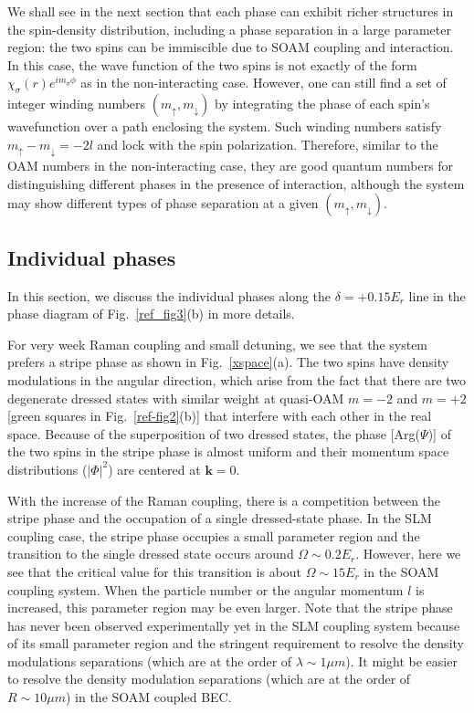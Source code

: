 \documentclass[twocolumn,pra,unsortedaddress,showpacs,floatfix,citeautoscript,nofootinbib]{revtex4-1}
\begin{document}
We shall see in the next section that each phase can exhibit
richer structures in the spin-density distribution, including a
phase separation in a large parameter region: the two spins can be
immiscible due to SOAM coupling and interaction. In this case, the
wave function of the two spins is not exactly of the form $\chi
_{\sigma }(r)e^{im_{\sigma }\phi }$ as in the non-interacting
case. However, one can still find a set of integer winding numbers
$(m_{\uparrow },m_{\downarrow })$ by integrating the phase of each
spin's wavefunction over a path enclosing the system. Such winding
numbers satisfy $m_{\uparrow }-m_{\downarrow }=-2l$ and lock with
the spin polarization. Therefore, similar to the OAM numbers in
the non-interacting case, they are good quantum numbers for
distinguishing different phases in the presence of interaction,
although the system may show different types of phase separation
at a given $(m_{\uparrow },m_{\downarrow })$.

\vspace{-0.3cm}
\subsection{Individual phases}
\vspace{-0.3cm}

In this section, we discuss the individual phases along the
$\delta=+0.15E_r$ line in the phase diagram of
Fig.~\ref{ref_fig3}(b) in more details.

For very week Raman coupling and small detuning, we see that the
system prefers a stripe phase as shown in Fig.~\ref{xspace}(a).
The two spins have density modulations in the angular direction,
which arise from the fact that there are two degenerate dressed
states with similar weight at quasi-OAM $m=-2$ and $m=+2$ [green
squares in Fig.~\ref{ref-fig2}(b)] that interfere with each other
in the real space. Because of the superposition of two dressed
states, the phase [Arg($\Psi $)] of the two spins in the stripe
phase is almost uniform and their momentum space distributions
($|\Phi |^{2}$) are centered at $\mathbf{k}=0$.

With the increase of the Raman coupling, there is a competition
between the stripe phase and the occupation of a single
dressed-state phase. In the SLM coupling case, the stripe phase
occupies a small parameter region and the transition to the single
dressed state occurs around $\Omega \sim 0.2E_{r}$. However, here
we see that the critical value for this transition is about
$\Omega \sim 15E_{r}$ in the SOAM coupling system. When the
particle number or the angular momentum $l$ is increased, this
parameter region may be even larger. Note that the stripe phase
has never been observed experimentally yet in the SLM coupling
system because of its small parameter region and the stringent
requirement to resolve the density modulations separations (which
are at the order of $\lambda \sim 1\mu m$). It might be easier to
resolve the density modulation separations (which are at the order
of $R\sim 10\mu m$) in the SOAM coupled BEC.
\end{document}
